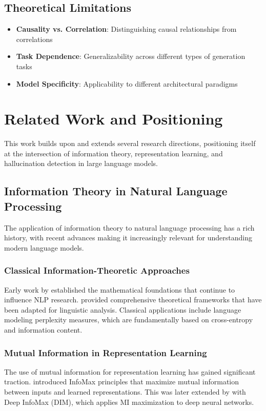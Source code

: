 \subsection{Theoretical Limitations}
\begin{itemize}
    \item \textbf{Causality vs. Correlation}: Distinguishing causal relationships from correlations
    \item \textbf{Task Dependence}: Generalizability across different types of generation tasks
    \item \textbf{Model Specificity}: Applicability to different architectural paradigms
\end{itemize}



\section{Related Work and Positioning}
\label{sec:related_work}

This work builds upon and extends several research directions, positioning itself at the intersection of information theory, representation learning, and hallucination detection in large language models.

\subsection{Information Theory in Natural Language Processing}
\label{subsec:info_theory_nlp}

The application of information theory to natural language processing has a rich history, with recent advances making it increasingly relevant for understanding modern language models.

\subsubsection{Classical Information-Theoretic Approaches}
Early work by \citet{shannon1948mathematical} established the mathematical foundations that continue to influence NLP research. \citet{cover1999elements} provided comprehensive theoretical frameworks that have been adapted for linguistic analysis. Classical applications include language modeling perplexity measures, which are fundamentally based on cross-entropy and information content.

\subsubsection{Mutual Information in Representation Learning}
The use of mutual information for representation learning has gained significant traction. \citet{linsker1988self} introduced InfoMax principles that maximize mutual information between inputs and learned representations. This was later extended by \citet{hjelm2019learning} with Deep InfoMax (DIM), which applies MI maximization to deep neural networks.

